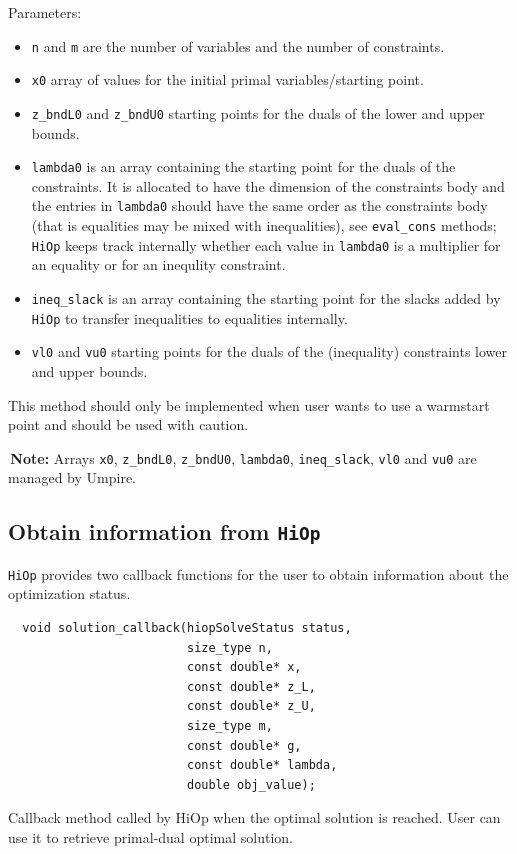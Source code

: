 \documentclass[11pt]{article}
\newcommand{\warningSymbol}{\raisebox{0.9\depth}{\danger}}
\newcommand{\warningcp}[1]{%
        \smallskip \noindent \textcolor{warningColorText}{\warningSymbol{}}\,\textbf{#1} %
    }
\newcommand{\Hi}{\texttt{HiOp}\xspace}
\begin{document}
  Parameters:
  \begin{itemize}
  \item \texttt{n} and \texttt{m} are the number of variables and the number of constraints.
  \item \texttt{x0} array of values for the initial primal variables/starting point.
  \item \texttt{z\_bndL0} and  \texttt{z\_bndU0} starting points for the duals of the lower and upper bounds.
  \item \texttt{lambda0} is an array containing the starting point for the duals of the constraints. It is allocated to have the dimension of the constraints body and the entries in \texttt{lambda0} should have the same order as the constraints body (that is equalities may be mixed with inequalities), see \texttt{eval\_cons} methods; \Hi keeps track internally whether each value in \texttt{lambda0} is a multiplier for an equality or for an inequlity constraint.
  \item \texttt{ineq\_slack} is an array containing the starting point for the slacks added by \Hi to transfer inequalities to equalities internally.
  \item \texttt{vl0} and  \texttt{vu0} starting points for the duals of the (inequality) constraints lower and upper bounds.
  \end{itemize}
    
  This method should only be implemented when user wants to use a warmstart point and should be used with caution.

  \warningcp{Note:} Arrays \texttt{x0}, \texttt{z\_bndL0}, \texttt{z\_bndU0}, \texttt{lambda0}, \texttt{ineq\_slack}, \texttt{vl0} and  \texttt{vu0} are managed by Umpire.
  
\subsection{Obtain information from \Hi}
\Hi provides two callback functions for the user to obtain information about the optimization status. 
\begin{lstlisting} 
  void solution_callback(hiopSolveStatus status,
                         size_type n,
                         const double* x,
                         const double* z_L,
                         const double* z_U,
                         size_type m,
                         const double* g,
                         const double* lambda,
                         double obj_value);
\end{lstlisting} 
Callback method called by HiOp when the optimal solution is reached. User can use it to retrieve primal-dual optimal solution.
\end{document}

